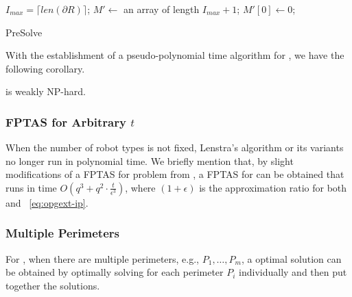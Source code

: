 \begin{algorithm}\label{algo:opgext-presol}
	\DontPrintSemicolon
		$I_{max} = \lceil len(\partial R)\rceil$; 
		$M' \leftarrow$ an array of length $I_{max} + 1$; 
		$M'[0]\leftarrow 0$;\;
	\caption{{\sc PreSolve}}
\end{algorithm}

With the establishment of a pseudo-polynomial time algorithm for \opgmc, we  
have the following corollary. 
\begin{corollary}
	\opgmc is weakly NP-hard. 
\end{corollary}

\subsubsection{FPTAS for Arbitrary $t$}
When the number of robot types is not fixed, Lenstra's algorithm\cite{lenstra1983integer} or 
its variants no longer run in polynomial time. We briefly mention that, 
by slight modifications of a FPTAS for \ttukp problem from \cite{ibarra1975fast}, a FPTAS 
for \opgmc can be obtained that runs in time $O(q^3 + q^2 \cdot \frac{t}{\epsilon^3})$, 
where $(1+\epsilon)$ is the approximation ratio for both \opgmc and ~\eqref{eq:opgext-ip}. 

\subsubsection{Multiple Perimeters} For \opgmc, when there are multiple 
perimeters, e.g., $P_1, \ldots, P_m$, a optimal solution can be obtained 
by optimally solving \opgmc for each perimeter $P_i$ individually and 
then put together the solutions. 

